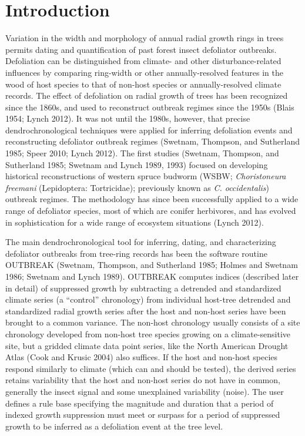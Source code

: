 \documentclass[review]{elsarticle} %
\begin{document}
\hypertarget{introduction}{%
\section{Introduction}\label{introduction}}

Variation in the width and morphology of annual radial growth rings in trees permits dating and quantification of past forest insect defoliator outbreaks. Defoliation can be distinguished from climate- and other disturbance-related influences by comparing ring-width or other annually-resolved features in the wood of host species to that of non-host species or annually-resolved climate records. The effect of defoliation on radial growth of trees has been recognized since the 1860s, and used to reconstruct outbreak regimes since the 1950s (Blais 1954; Lynch 2012). It was not until the 1980s, however, that precise dendrochronological techniques were applied for inferring defoliation events and reconstructing defoliator outbreak regimes (Swetnam, Thompson, and Sutherland 1985; Speer 2010; Lynch 2012). The first studies (Swetnam, Thompson, and Sutherland 1985; Swetnam and Lynch 1989, 1993) focused on developing historical reconstructions of western spruce budworm (WSBW; \emph{Choristoneura freemani} (Lepidoptera: Tortricidae); previously known as \emph{C. occidentalis}) outbreak regimes. The methodology has since been successfully applied to a wide range of defoliator species, most of which are conifer herbivores, and has evolved in sophistication for a wide range of ecosystem situations (Lynch 2012).

The main dendrochronological tool for inferring, dating, and characterizing defoliator outbreaks from tree-ring records has been the software routine OUTBREAK (Swetnam, Thompson, and Sutherland 1985; Holmes and Swetnam 1986; Swetnam and Lynch 1989). OUTBREAK computes indices (described later in detail) of suppressed growth by subtracting a detrended and standardized climate series (a ``control'' chronology) from individual host-tree detrended and standardized radial growth series after the host and non-host series have been brought to a common variance. The non-host chronology usually consists of a site chronology developed from non-host tree species growing on a climate-sensitive site, but a gridded climate data point series, like the North American Drought Atlas (Cook and Krusic 2004) also suffices. If the host and non-host species respond similarly to climate (which can and should be tested), the derived series retains variability that the host and non-host series do not have in common, generally the insect signal and some unexplained variability (noise). The user defines a rule base specifying the magnitude and duration that a period of indexed growth suppression must meet or surpass for a period of suppressed growth to be inferred as a defoliation event at the tree level.
\end{document}
